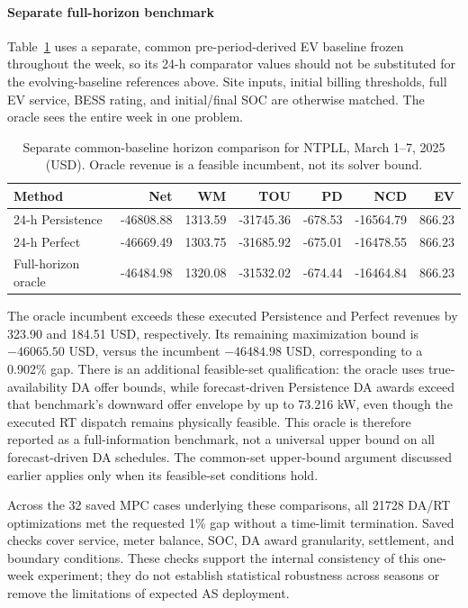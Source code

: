 \documentclass[final,5p,times]{elsarticle}
\begin{document}
\paragraph{Separate full-horizon benchmark}
Table~\ref{tab:weekly_horizon} uses a separate, common pre-period-derived EV
baseline frozen throughout the week, so its 24-h comparator values should
not be substituted for the evolving-baseline references above. Site inputs,
initial billing thresholds, full EV service, BESS rating, and initial/final
SOC are otherwise matched. The oracle sees the entire week in one problem.
\begin{table}[p]
\centering
\caption{Separate common-baseline horizon comparison for NTPLL, March 1--7, 2025 (USD). Oracle revenue is a feasible incumbent, not its solver bound.}
\label{tab:weekly_horizon}
\footnotesize
\setlength{\tabcolsep}{5pt}
\begin{tabular}{lrrrrrr}
\toprule
Method & Net & WM & TOU & PD & NCD & EV \\
\midrule
24-h Persistence & -46808.88 & 1313.59 & -31745.36 & -678.53 & -16564.79 & 866.23 \\
24-h Perfect & -46669.49 & 1303.75 & -31685.92 & -675.01 & -16478.55 & 866.23 \\
Full-horizon oracle & -46484.98 & 1320.08 & -31532.02 & -674.44 & -16464.84 & 866.23 \\
\bottomrule
\end{tabular}
\end{table}

The oracle incumbent exceeds these executed Persistence and Perfect revenues
by 323.90 and 184.51 USD, respectively. Its remaining maximization bound is
$-46065.50$ USD, versus the incumbent $-46484.98$ USD, corresponding to a
0.902\% gap. There is an additional feasible-set qualification: the oracle
uses true-availability DA offer bounds, while forecast-driven Persistence DA
awards exceed that benchmark's downward offer envelope by up to 73.216 kW,
even though the executed RT dispatch remains physically feasible. This
oracle is therefore reported as a full-information benchmark, not a
universal upper bound on all forecast-driven DA schedules. The common-set
upper-bound argument discussed earlier applies only when its feasible-set
conditions hold.

Across the 32 saved MPC cases underlying these comparisons, all 21728 DA/RT
optimizations met the requested 1\% gap without a time-limit termination.
Saved checks cover service, meter balance, SOC, DA award granularity,
settlement, and boundary conditions. These checks support the internal
consistency of this one-week experiment; they do not establish statistical
robustness across seasons or remove the limitations of expected AS deployment.
\end{document}
